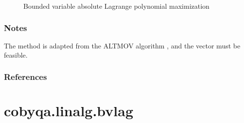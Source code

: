 \documentclass[letterpaper,10pt,english]{sphinxmanual}
\begin{document}
\begin{fulllineitems}
\nopagebreak

\begin{description}
\item[{{\hyperref[\detokenize{refs/generated/cobyqa.linalg.bvlag:cobyqa.linalg.bvlag}]{}}}] \leavevmode
\sphinxAtStartPar
Bounded variable absolute Lagrange polynomial maximization

\end{description}


\subsubsection*{Notes}

\sphinxAtStartPar
The method is adapted from the ALTMOV algorithm , and the vector
 must be feasible.
\subsubsection*{References}

\sphinxAtStartPar
{}

\end{fulllineitems}



\section{cobyqa.linalg.bvlag}
\label{\detokenize{refs/generated/cobyqa.linalg.bvlag:cobyqa-linalg-bvlag}}\label{\detokenize{refs/generated/cobyqa.linalg.bvlag::doc}}
\end{document}
